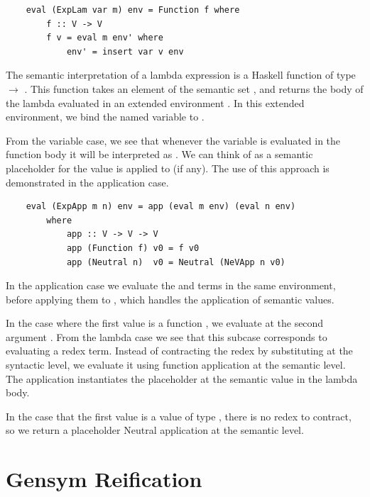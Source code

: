 \begin{lstlisting}
    eval (ExpLam var m) env = Function f where
        f :: V -> V
        f v = eval m env' where
            env' = insert var v env
\end{lstlisting}

The semantic interpretation of a lambda expression is a Haskell function of type  $\rightarrow$ . This function takes an element  of the semantic set , and returns the body of the lambda evaluated in an extended environment . In this extended environment, we bind the named variable  to .

From the variable case, we see that whenever the variable  is evaluated in the function body it will be interpreted as . We can think of  as a semantic placeholder for the value  is applied to (if any). The use of this approach is demonstrated in the application case.

\begin{lstlisting}
    eval (ExpApp m n) env = app (eval m env) (eval n env)
        where
            app :: V -> V -> V
            app (Function f) v0 = f v0
            app (Neutral n)  v0 = Neutral (NeVApp n v0)
\end{lstlisting}

In the application case we evaluate the  and  terms in the same environment, before applying them to , which handles the application of semantic values. 

In the case where the first value is a function , we evaluate  at the second argument . From the lambda case we see that this subcase corresponds to evaluating a redex term. Instead of contracting the redex by substituting at the syntactic level, we evaluate it using function application at the semantic level. The application instantiates the placeholder  at the semantic value  in the lambda body. 

In the case that the first value is a value  of type , there is no redex to contract, so we return a placeholder Neutral application at the semantic level.

\section{Gensym Reification}


